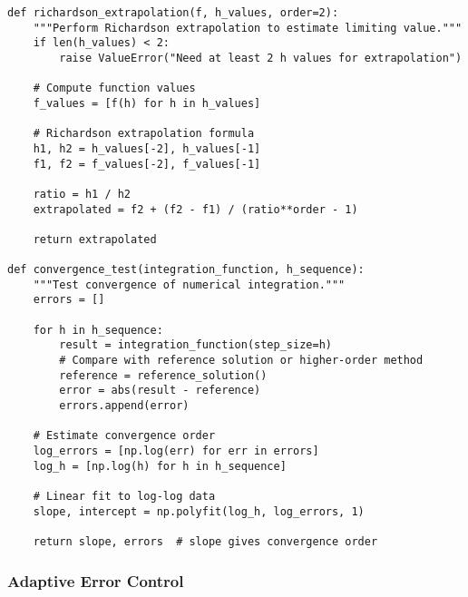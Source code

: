 \begin{verbatim}
def richardson_extrapolation(f, h_values, order=2):
    """Perform Richardson extrapolation to estimate limiting value."""
    if len(h_values) < 2:
        raise ValueError("Need at least 2 h values for extrapolation")
    
    # Compute function values
    f_values = [f(h) for h in h_values]
    
    # Richardson extrapolation formula
    h1, h2 = h_values[-2], h_values[-1]
    f1, f2 = f_values[-2], f_values[-1]
    
    ratio = h1 / h2
    extrapolated = f2 + (f2 - f1) / (ratio**order - 1)
    
    return extrapolated

def convergence_test(integration_function, h_sequence):
    """Test convergence of numerical integration."""
    errors = []
    
    for h in h_sequence:
        result = integration_function(step_size=h)
        # Compare with reference solution or higher-order method
        reference = reference_solution()
        error = abs(result - reference)
        errors.append(error)
    
    # Estimate convergence order
    log_errors = [np.log(err) for err in errors]
    log_h = [np.log(h) for h in h_sequence]
    
    # Linear fit to log-log data
    slope, intercept = np.polyfit(log_h, log_errors, 1)
    
    return slope, errors  # slope gives convergence order
\end{verbatim}

\subsubsection{Adaptive Error Control}

